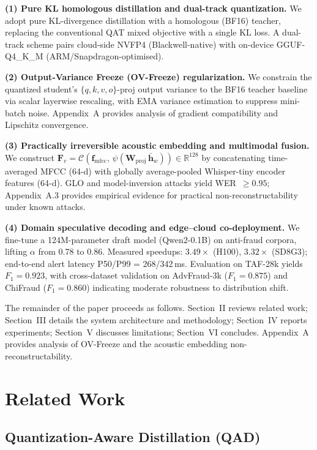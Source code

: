 \documentclass[lettersize,journal]{IEEEtran}
\begin{document}
\textbf{(1) Pure KL homologous distillation and dual-track quantization.} We adopt pure KL-divergence distillation with a homologous (BF16) teacher, replacing the conventional QAT mixed objective with a single KL loss. A dual-track scheme pairs cloud-side NVFP4 (Blackwell-native) with on-device GGUF-Q4\_K\_M (ARM/Snapdragon-optimised).

\textbf{(2) Output-Variance Freeze (OV-Freeze) regularization.} We constrain the quantized student's $\{q,k,v,o\}$-proj output variance to the BF16 teacher baseline via scalar layerwise rescaling, with EMA variance estimation to suppress mini-batch noise. Appendix~A provides analysis of gradient compatibility and Lipschitz convergence.

\textbf{(3) Practically irreversible acoustic embedding and multimodal fusion.} We construct $\bm{F}_v = \mathcal{C}\!\left(\bm{f}_{\mathrm{mfcc}},\,\psi(\bm{W}_{\mathrm{proj}}\,\bar{\bm{h}}_w)\right) \in \mathbb{R}^{128}$ by concatenating time-averaged MFCC (64-d) with globally average-pooled Whisper-tiny encoder features (64-d). GLO and model-inversion attacks yield WER~$\ge 0.95$; Appendix~A.3 provides empirical evidence for practical non-reconstructability under known attacks.

\textbf{(4) Domain speculative decoding and edge--cloud co-deployment.} We fine-tune a 124M-parameter draft model (Qwen2-0.1B) on anti-fraud corpora, lifting $\alpha$ from 0.78 to 0.86. Measured speedups: $3.49\times$ (H100), $3.32\times$ (SD8G3); end-to-end alert latency P50/P99 = 268/342\,ms. Evaluation on TAF-28k yields $F_1 = 0.923$, with cross-dataset validation on AdvFraud-3k ($F_1 = 0.875$) and ChiFraud ($F_1 = 0.860$) indicating moderate robustness to distribution shift.

The remainder of the paper proceeds as follows. Section~II reviews related work; Section~III details the system architecture and methodology; Section~IV reports experiments; Section~V discusses limitations; Section~VI concludes. Appendix~A provides analysis of OV-Freeze and the acoustic embedding non-reconstructability.

\section{Related Work}
\subsection{Quantization-Aware Distillation (QAD)}
\end{document}
